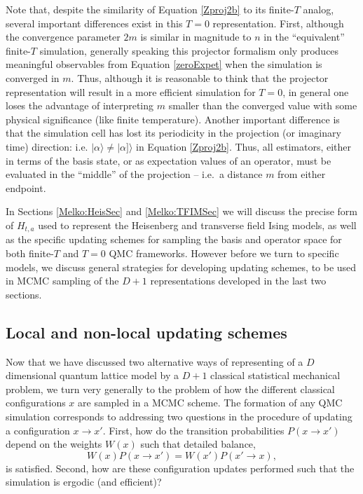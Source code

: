 \documentclass[vecphys]{svmult}
\begin{document}
Note that, despite the similarity of Equation \ref{Zproj2b} to its finite-$T$ analog, several important differences exist in this $T=0$ representation.  First, although the convergence parameter $2m$ is similar in magnitude to $n$ in the ``equivalent'' finite-$T$ simulation, 
generally speaking this projector formalism only produces meaningful observables from Equation \ref{zeroExpet} when the simulation is converged in $m$.  Thus, although it is reasonable to think that the projector representation will result in a more efficient simulation for $T=0$, in general one loses the advantage of interpreting $m$ smaller than the converged value with some physical significance (like finite temperature).
Another important difference is that the simulation cell has lost its periodicity in the projection (or imaginary time) direction: i.e. $| \alpha \rangle \neq | \alpha] \rangle$ in Equation \ref{Zproj2b}.  Thus, all estimators, either in terms of the basis state, or as expectation values of an operator, must be evaluated in the ``middle'' of the projection -- i.e.~a distance $m$ from either endpoint.

In Sections \ref{Melko:HeisSec} and \ref{Melko:TFIMSec} we will discuss the precise form of $H_{t,a}$ used to represent the Heisenberg and transverse field Ising models, as well as the specific updating schemes for sampling the basis and operator space for both finite-$T$ and $T=0$ QMC frameworks.  However before we turn to specific models, we discuss general strategies for developing updating schemes, to be used in MCMC sampling of the $D+1$ representations developed in the last two sections.


\subsection{Local and non-local updating schemes} \label{Melko:updates}

Now that we have discussed two alternative ways of representing of a $D$ dimensional quantum lattice model by a $D+1$ classical statistical mechanical problem, we turn very generally to the problem of how the different classical configurations $x$ are sampled in a MCMC scheme.
The formation of any QMC simulation corresponds to addressing two questions in the procedure of updating a configuration $x \rightarrow x'$. First, how do the transition probabilities $P(x \rightarrow x')$ depend on the weights $W(x)$ such that detailed balance,
\begin{equation}
 W(x)P(x \rightarrow x') = W(x')P(x' \rightarrow x), \label{detb}
 \end{equation}
 is satisfied. Second, how are these configuration updates performed such that the simulation is ergodic (and efficient)?
\end{document}
